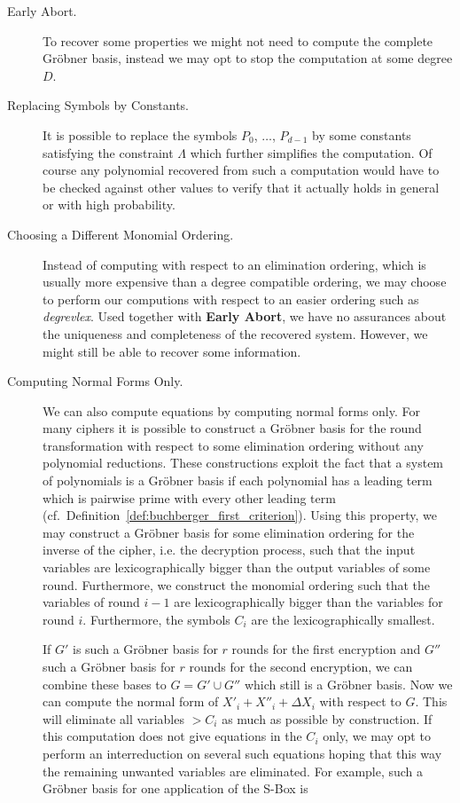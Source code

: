 \begin{description}
 \item[Early Abort.]  To recover some properties we might not need to compute the complete Gr\"obner basis, instead we may opt to stop the computation at some degree \(D\). 


\item[Replacing Symbols by Constants.] It is possible to replace the symbols $P_0$, $\dots$, $P_{d-1}$ by some constants satisfying the constraint $\Lambda$ which further simplifies the computation. Of course any polynomial recovered from such a computation would have to be checked against other values to verify that it actually holds in general or with high probability.

\item[Choosing a Different Monomial Ordering.] Instead of computing with respect to an elimination ordering, which is usually more expensive than a degree compatible ordering, we may choose to perform our computions with respect to  an easier ordering such as \emph{degrevlex}. 
Used together with {\bf Early Abort},  we have no assurances about the uniqueness and completeness of the recovered system. However, we might still be able to recover some information.

\item[Computing Normal Forms Only.] We can also compute equations by computing normal forms only. For many ciphers it is possible to construct a Gröbner basis for the round transformation \cite{Buchmann2006,bulgin-brickenstein:eprint2008} with respect to some elimination ordering without any polynomial reductions. These constructions exploit the fact that a system of polynomials is a Gröbner basis if each polynomial has a leading term which is pairwise prime with every other leading term (cf.\ Definition~\ref{def:buchberger_first_criterion}).  Using this property, we may construct a Gröbner basis for some elimination ordering for the inverse of the cipher, i.e. the decryption process, such that the input variables are lexicographically bigger than the output variables of some round. Furthermore, we construct the monomial ordering such that the variables of round $i-1$ are lexicographically bigger than the variables for round $i$. Furthermore, the symbols $C_i$ are the lexicographically smallest. 
 
If $G'$ is such a Gröbner basis for $r$ rounds for the first encryption and $G''$ such a Gröbner basis for $r$ rounds for the second encryption, we can combine these bases to $G = G' \cup G''$ which still is a Gröbner basis. Now we can compute the normal form of $X'_i + X''_i + \Delta X_i$ with respect to $G$. This will eliminate all variables $> C_i$ as much as possible by construction. If this computation does not give equations in the $C_i$ only, we may opt to perform an interreduction on several such equations hoping that this way the remaining unwanted variables are eliminated. For example, such a Gröbner basis for one application of the \PRESENT S-Box is


\end{description}
